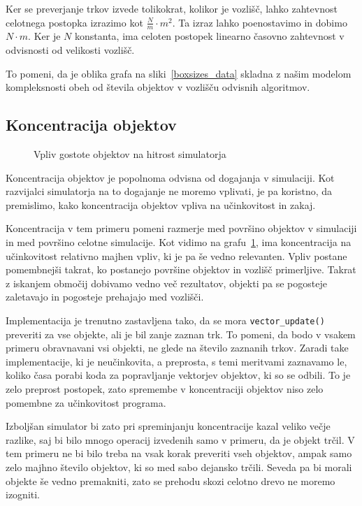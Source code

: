 \documentclass[a4paper,12pt]{article}
\begin{document}
Ker se preverjanje trkov izvede tolikokrat, kolikor je vozlišč, lahko zahtevnost celotnega postopka
izrazimo kot {\small$ \frac{N}{m} \cdot m^2 $}. Ta izraz lahko poenostavimo in dobimo $N \cdot m$. Ker je
$N$ konstanta, ima celoten postopek linearno časovno zahtevnost v odvisnosti od velikosti vozlišč.

To pomeni, da je oblika grafa na sliki~\ref{boxsizes_data} skladna z našim modelom kompleksnosti obeh
od števila objektov v vozlišču odvisnih algoritmov. 

\clearpage
\subsection{Koncentracija objektov}

\begin{figure}
    \caption{Vpliv gostote objektov na hitrost simulatorja}%
    \label{density}
\end{figure}

Koncentracija objektov je popolnoma odvisna od dogajanja v simulaciji. Kot razvijalci simulatorja na to
dogajanje ne moremo vplivati, je pa koristno, da premislimo, kako koncentracija objektov vpliva na učinkovitost in zakaj.

Koncentracija v tem primeru pomeni razmerje med površino objektov v simulaciji in med površino celotne simulacije.
Kot vidimo na grafu~\ref{density}, ima koncentracija na učinkovitost relativno majhen vpliv, ki je pa še vedno relevanten.
Vpliv postane pomembnejši takrat, ko postanejo površine objektov in vozlišč primerljive. Takrat z iskanjem območij dobivamo
vedno več rezultatov, objekti pa se pogosteje zaletavajo in pogosteje prehajajo med vozlišči.

Implementacija je trenutno zastavljena tako, da se mora \lstinline|vector_update()| preveriti za vse objekte,
ali je bil zanje zaznan trk. To pomeni, da bodo v vsakem primeru obravnavani vsi objekti, ne glede na število zaznanih trkov.
Zaradi take implementacije, ki je neučinkovita, a preprosta, s temi meritvami zaznavamo le, koliko časa porabi
koda za popravljanje vektorjev objektov, ki so se odbili. To je zelo preprost postopek, zato spremembe v koncentraciji
objektov niso zelo pomembne za učinkovitost programa.

Izboljšan simulator bi zato pri spreminjanju koncentracije kazal veliko večje razlike, saj bi bilo mnogo
operacij izvedenih samo v primeru, da je objekt trčil. V tem primeru ne bi bilo treba na vsak korak preveriti vseh objektov,
ampak samo zelo majhno število objektov, ki so med sabo dejansko trčili. Seveda pa bi morali objekte še vedno premakniti,
zato se prehodu skozi celotno drevo ne moremo izogniti.
\newpage
\end{document}
